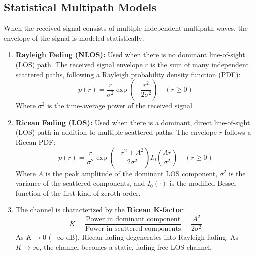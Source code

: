 \documentclass[12pt,a4paper]{article}
\begin{document}
\subsection{Statistical Multipath Models}
When the received signal consists of multiple independent multipath waves, the envelope of the signal is modeled statistically:
\begin{enumerate}[label=\textbf{\arabic*.}, leftmargin=*, itemsep=4pt]
  \item \textbf{Rayleigh Fading (NLOS):} Used when there is no dominant line-of-sight (LOS) path. The received signal envelope $r$ is the sum of many independent scattered paths, following a Rayleigh probability density function (PDF):
    \begin{equation}
      p(r) = \frac{r}{\sigma^2} \exp\left(-\frac{r^2}{2\sigma^2}\right) \quad (r \ge 0)
    \end{equation}
    Where $\sigma^2$ is the time-average power of the received signal.
  \item \textbf{Ricean Fading (LOS):} Used when there is a dominant, direct line-of-sight (LOS) path in addition to multiple scattered paths. The envelope $r$ follows a Ricean PDF:
    \begin{equation}
      p(r) = \frac{r}{\sigma^2} \exp\left(-\frac{r^2 + A^2}{2\sigma^2}\right) I_0\left(\frac{A r}{\sigma^2}\right) \quad (r \ge 0)
    \end{equation}
    Where $A$ is the peak amplitude of the dominant LOS component, $\sigma^2$ is the variance of the scattered components, and $I_0(\cdot)$ is the modified Bessel function of the first kind of zeroth order.
  \item The channel is characterized by the \textbf{Ricean K-factor}:
    \begin{equation}
      K = \frac{\text{Power in dominant component}}{\text{Power in scattered components}} = \frac{A^2}{2\sigma^2}
    \end{equation}
    As $K \to 0$ ($-\infty$ dB), Ricean fading degenerates into Rayleigh fading. As $K \to \infty$, the channel becomes a static, fading-free LOS channel.
\end{enumerate}
\end{document}
